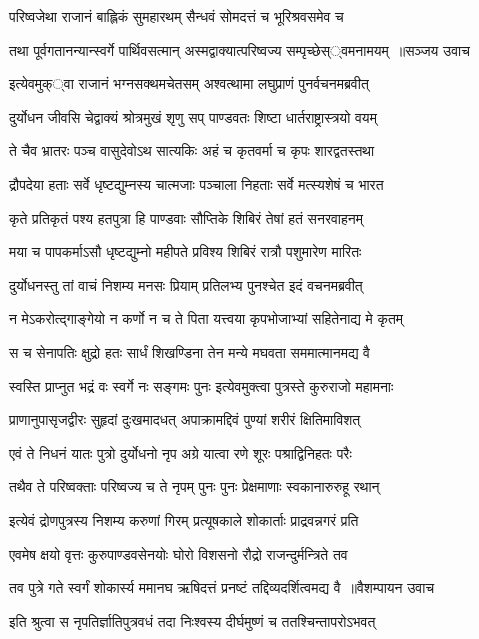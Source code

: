 \twolineshloka
{परिष्वजेथा राजानं बाह्लिकं सुमहारथम्}
{सैन्धवं सोमदत्तं च भूरिश्रवसमेव च}


\threelineshloka
{तथा पूर्वगतानन्यान्स्वर्गे पार्थिवसत्मान्}
{अस्मद्वाक्यात्परिष्वज्य सम्पृच्छेस््वमनामयम् ॥सञ्जय उवाच}
{}


\twolineshloka
{इत्येवमुक््वा राजानं भग्नसक्थमचेतसम्}
{अश्वत्थामा लघुप्राणं पुनर्वचनमब्रवीत्}


\twolineshloka
{दुर्योधन जीवसि चेद्वाक्यं श्रोत्रमुखं शृणु}
{सप् पाण्डवतः शिष्टा धार्तराष्ट्रास्त्रयो वयम्}


\twolineshloka
{ते चैव भ्रातरः पञ्च वासुदेवोऽथ सात्यकिः}
{अहं च कृतवर्मा च कृपः शारद्वतस्तथा}


\twolineshloka
{द्रौपदेया हताः सर्वे धृष्टद्युम्नस्य चात्मजाः}
{पञ्चाला निहताः सर्वे मत्स्यशेषं च भारत}


\twolineshloka
{कृते प्रतिकृतं पश्य हतपुत्रा हि पाण्डवाः}
{सौप्तिके शिबिरं तेषां हतं सनरवाहनम्}


\twolineshloka
{मया च पापकर्माऽसौ धृष्टद्युम्नो महीपते}
{प्रविश्य शिबिरं रात्रौ पशुमारेण मारितः}


\twolineshloka
{दुर्योधनस्तु तां वाचं निशम्य मनसः प्रियाम्}
{प्रतिलभ्य पुनश्चेत इदं वचनमब्रवीत्}


\twolineshloka
{न मेऽकरोत्द्गाङ्गेयो न कर्णो न च ते पिता}
{यत्त्वया कृपभोजाभ्यां सहितेनाद्य मे कृतम्}


\twolineshloka
{स च सेनापतिः क्षुद्रो हतः सार्धं शिखण्डिना}
{तेन मन्ये मघवता सममात्मानमद्य वै}


\twolineshloka
{स्वस्ति प्राप्नुत भद्रं वः स्वर्गे नः सङ्गमः पुनः}
{इत्येवमुक्त्वा पुत्रस्ते कुरुराजो महामनाः}


\twolineshloka
{प्राणानुपासृजद्वीरः सुहृदां दुःखमादधत्}
{अपाक्रामद्दिवं पुण्यां शरीरं क्षितिमाविशत्}


\twolineshloka
{एवं ते निधनं यातः पुत्रो दुर्योधनो नृप}
{अग्रे यात्वा रणे शूरः पश्राद्विनिहतः परैः}


\twolineshloka
{तथैव ते परिष्वक्ताः परिष्वज्य च ते नृपम्}
{पुनः पुनः प्रेक्षमाणाः स्वकानारुरुहू रथान्}


\twolineshloka
{इत्येवं द्रोणपुत्रस्य निशम्य करुणां गिरम्}
{प्रत्यूषकाले शोकार्ताः प्राद्रवन्नगरं प्रति}


\twolineshloka
{एवमेष क्षयो वृत्तः कुरुपाण्डवसेनयोः}
{घोरो विशसनो रौद्रो राजन्दुर्मन्त्रिते तव}


\threelineshloka
{तव पुत्रे गते स्वर्गं शोकार्स्य ममानघ}
{ऋषिदत्तं प्रनष्टं तद्दिव्यदर्शित्वमद्य वै ॥वैशम्पायन उवाच}
{}


\twolineshloka
{इति श्रुत्वा स नृपतिर्ज्ञातिपुत्रवधं तदा}
{निःश्वस्य दीर्घमुष्णं च ततश्चिन्तापरोऽभवत्}


